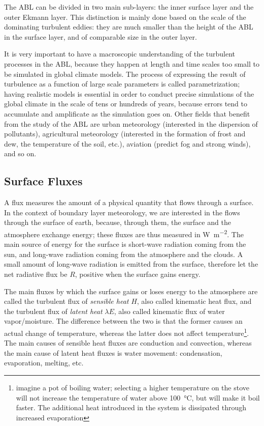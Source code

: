 \documentclass[a4paper]{book}
\begin{document}
The ABL can be divided in two main sub-layers: the inner surface layer and the outer Ekmann layer. This distinction is mainly done based on the scale of the dominating turbulent eddies: they are much smaller than the height of the ABL in the surface layer, and of comparable size in the outer layer.

It is very important to have a macroscopic understanding of the turbulent processes in the ABL, because they happen at length and time scales too small to be simulated in global climate models. The process of expressing the result of turbulence as a function of large scale parameters is called parametrization; having realistic models is essential in order to conduct precise simulations of the global climate in the scale of tens or hundreds of years, because errors tend to accumulate and amplificate as the simulation goes on. Other fields that benefit from the study of the ABL are urban meteorology (interested in the dispersion of pollutants), agricultural meteorology (interested in the formation of frost and dew, the temperature of the soil, etc.), aviation (predict fog and strong winds), and so on.

\subsection{Surface Fluxes}
A flux measures the amount of a physical quantity that flows through a surface. In the context of boundary layer meteorology, we are interested in the flows through the surface of earth, because, through them, the surface and the atmosphere exchange energy; these fluxes are thus measured in \si{\watt\per\square\meter}. The main source of energy for the surface is short-wave radiation coming from the sun, and long-wave radiation coming from the atmosphere and the clouds. A small amount of long-wave radiation is emitted from the surface, therefore let the net radiative flux be $R$, positive when the surface gains energy.

The main fluxes by which the surface gains or loses energy to the atmosphere are called the turbulent flux of \emph{sensible heat} $H$, also called kinematic heat flux, and the turbulent flux of \emph{latent heat} $\lambda E$, also called kinematic flux of water vapor/moisture. The difference between the two is that the former causes an actual change of temperature, whereas the latter does not affect temperature\footnote{imagine a pot of boiling water; selecting a higher temperature on the stove will not increase the temperature of water above \SI{100}{\celsius}, but will make it boil faster. The additional heat introduced in the system is dissipated through increased evaporation}. The main causes of sensible heat fluxes are conduction and convection, whereas the main cause of latent heat fluxes is water movement: condensation, evaporation, melting, etc. 
\end{document}

